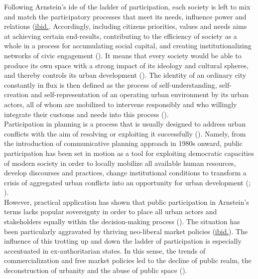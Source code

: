 \documentclass[11pt]{report}
\begin{document}
Following Arnstein’s ide of the ladder of participation, each society is left to mix and match the participatory processes that meet its needs, influence power and relations (\href{Fisher}{ibid.}.
Accordingly, including citizens priorities, values and needs aims at achieving certain end-results, contributing to the efficiency of society as a whole in a process for accumulating social capital, and creating institutionalizing networks of civic engagement (\href{Putnam}{\citealt{putnam_making_1993}}).
It means that every society would be able to produce its own space with a strong impact of its ideology and cultural spheres, and thereby controls its urban development (\href{Lefebvre}{\citealt{lefebvre_production_1974}}). 
The identity of an ordinary city constantly in flux is then defined as the process of self-understanding, self-creation and self-representation of an operating urban environment by its urban actors, all of whom are mobilized to intervene responsibly and who willingly integrate their customs and needs into this process
(\href{Bolay}{\citealt{bolay_urban_2004}}).
\\

Participation in planning is a process that is usually designed to address urban conflicts with the aim of resolving or exploiting it successfully (\href{Fisher}{\citealt{fisher_building_2001}}).
Namely, from the introduction of communicative planning approach in 1980s onward, public participation has been set in motion as a tool for exploiting democratic capacities of modern society in order to locally mobilize all available human resources, develop discourses and practices, change institutional conditions to transform a crisis of aggregated urban conflicts into an opportunity for urban development
(\href{Healey}{\citealt{healey_communicative_1996}}; \href{Scharpf}{\citealt{scharpf_XXX_1997}}).
\\

However, practical application has shown that public participation in Arnstein’s terms lacks popular sovereignty in order to place all urban actors and stakeholders equally within the decision-making process
(\href{Mouffe}{\citealt{mouffe_which_2002}}).
The situation has been particularly aggravated by thriving neo-liberal market policies (\href{Mouffe}{ibid.}).
The influence of this trotting up and down the ladder of participation is especially accentuated in ex-authoritarian states.
In this sense, the trends of commercialization and free market policies led to the decline of public realm, the deconstruction of urbanity and the abuse of public space
(\href{Hirt}{\citealt{hirt_landscapes_2008}}).
\\
\end{document}
